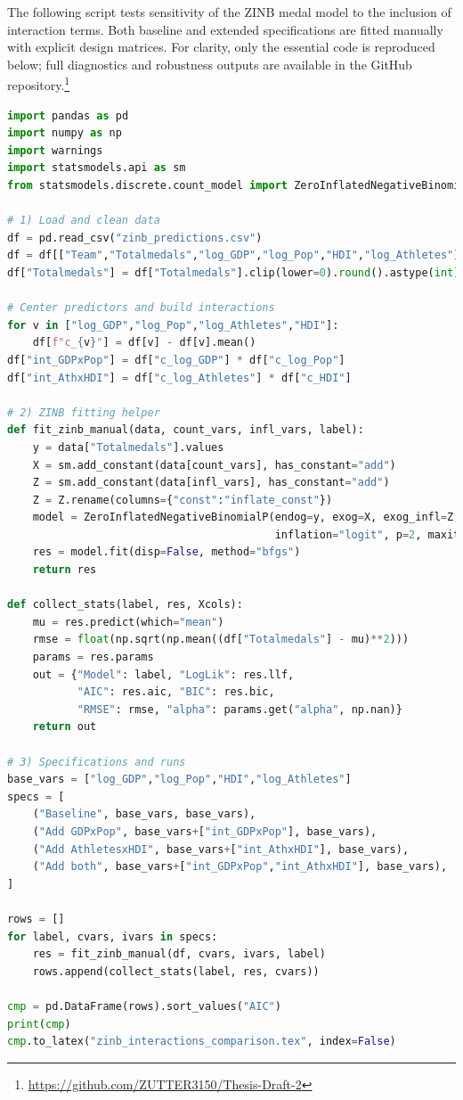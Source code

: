 \documentclass[11pt,twoside]{article}
\numberwithin{Theorem}{section}
\numberwithin{Definition}{section}
\numberwithin{Lemma}{section}
\numberwithin{Algorithm}{section}
\numberwithin{equation}{section}
\begin{document}
The following script tests sensitivity of the ZINB medal model to the inclusion of
interaction terms. Both baseline and extended specifications are fitted manually
with explicit design matrices. For clarity, only the essential code is reproduced
below; full diagnostics and robustness outputs are available in the GitHub 
repository.\footnote{\url{https://github.com/ZUTTER3150/Thesis-Draft-2}}

\begin{lstlisting}[language=Python, caption={ZINB model sensitivity with interaction terms}, label={lst:zinb_interaction_sensitivity}]
import pandas as pd
import numpy as np
import warnings
import statsmodels.api as sm
from statsmodels.discrete.count_model import ZeroInflatedNegativeBinomialP

# 1) Load and clean data
df = pd.read_csv("zinb_predictions.csv")
df = df[["Team","Totalmedals","log_GDP","log_Pop","HDI","log_Athletes"]].dropna()
df["Totalmedals"] = df["Totalmedals"].clip(lower=0).round().astype(int)

# Center predictors and build interactions
for v in ["log_GDP","log_Pop","log_Athletes","HDI"]:
    df[f"c_{v}"] = df[v] - df[v].mean()
df["int_GDPxPop"] = df["c_log_GDP"] * df["c_log_Pop"]
df["int_AthxHDI"] = df["c_log_Athletes"] * df["c_HDI"]

# 2) ZINB fitting helper
def fit_zinb_manual(data, count_vars, infl_vars, label):
    y = data["Totalmedals"].values
    X = sm.add_constant(data[count_vars], has_constant="add")
    Z = sm.add_constant(data[infl_vars], has_constant="add")
    Z = Z.rename(columns={"const":"inflate_const"})
    model = ZeroInflatedNegativeBinomialP(endog=y, exog=X, exog_infl=Z,
                                          inflation="logit", p=2, maxiter=500)
    res = model.fit(disp=False, method="bfgs")
    return res

def collect_stats(label, res, Xcols):
    mu = res.predict(which="mean")
    rmse = float(np.sqrt(np.mean((df["Totalmedals"] - mu)**2)))
    params = res.params
    out = {"Model": label, "LogLik": res.llf,
           "AIC": res.aic, "BIC": res.bic,
           "RMSE": rmse, "alpha": params.get("alpha", np.nan)}
    return out

# 3) Specifications and runs
base_vars = ["log_GDP","log_Pop","HDI","log_Athletes"]
specs = [
    ("Baseline", base_vars, base_vars),
    ("Add GDPxPop", base_vars+["int_GDPxPop"], base_vars),
    ("Add AthletesxHDI", base_vars+["int_AthxHDI"], base_vars),
    ("Add both", base_vars+["int_GDPxPop","int_AthxHDI"], base_vars),
]

rows = []
for label, cvars, ivars in specs:
    res = fit_zinb_manual(df, cvars, ivars, label)
    rows.append(collect_stats(label, res, cvars))

cmp = pd.DataFrame(rows).sort_values("AIC")
print(cmp)
cmp.to_latex("zinb_interactions_comparison.tex", index=False)
\end{lstlisting}

\clearpage
\end{document}
